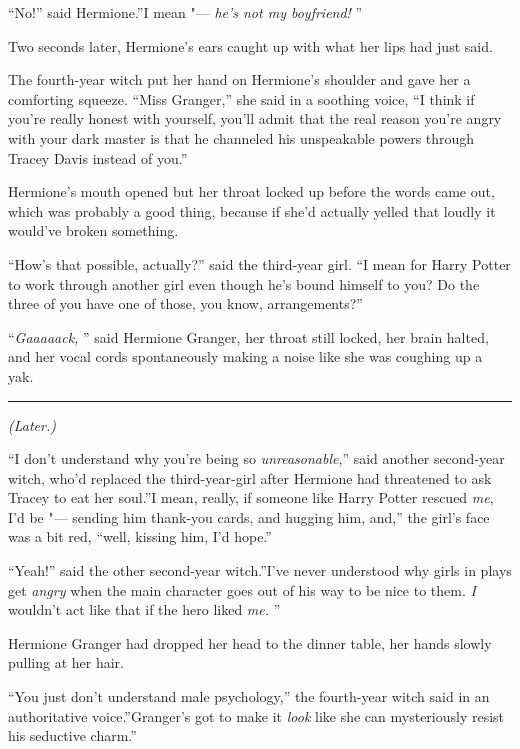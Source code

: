 ``No!'' said Hermione.''I mean "--- \emph{he's not my boyfriend!} ''

Two seconds later, Hermione's ears caught up with what her lips had just
said.

The fourth-year witch put her hand on Hermione's shoulder and gave her a
comforting squeeze. ``Miss Granger,'' she said in a soothing voice, ``I
think if you're really honest with yourself, you'll admit that the real
reason you're angry with your dark master is that he channeled his
unspeakable powers through Tracey Davis instead of you.''

Hermione's mouth opened but her throat locked up before the words came
out, which was probably a good thing, because if she'd actually yelled
that loudly it would've broken something.

``How's that possible, actually?'' said the third-year girl. ``I mean
for Harry Potter to work through another girl even though he's bound
himself to you? Do the three of you have one of those, you know,
arrangements?''

``\emph{Gaaaaack,} '' said Hermione Granger, her throat still locked, her
brain halted, and her vocal cords spontaneously making a noise like she
was coughing up a yak.

\begin{center}\rule{3in}{0.4pt}\end{center}

\emph{(Later.)}

``I don't understand why you're being so \emph{unreasonable},'' said
another second-year witch, who'd replaced the third-year-girl after
Hermione had threatened to ask Tracey to eat her soul.''I mean, really,
if someone like Harry Potter rescued \emph{me}, I'd be "--- sending him
thank-you cards, and hugging him, and,'' the girl's face was a bit red,
``well, kissing him, I'd hope.''

``Yeah!'' said the other second-year witch.''I've never understood why
girls in plays get \emph{angry} when the main character goes out of his
way to be nice to them. \emph{I} wouldn't act like that if the hero
liked \emph{me.} ''

Hermione Granger had dropped her head to the dinner table, her hands
slowly pulling at her hair.

``You just don't understand male psychology,'' the fourth-year witch
said in an authoritative voice.''Granger's got to make it \emph{look}
like she can mysteriously resist his seductive charm.''

